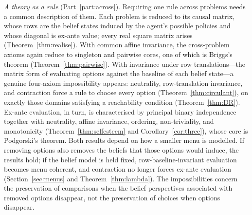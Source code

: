 \emph{A theory as a rule} (Part~\ref{part:across}). Requiring one rule across problems needs a common
description of them. Each problem is reduced to its causal matrix, whose rows are the belief states
induced by the agent's possible policies and whose diagonal is ex-ante value; every real square matrix
arises (Theorem~\ref{thm:realise}). With common affine invariance, the cross-problem axioms again
reduce to singleton and pairwise cores, one of which is Briggs's theorem (Theorem~\ref{thm:pairwise}).
With invariance under row translations---the matrix form of evaluating options against the baseline
of each belief state---a genuine four-axiom impossibility appears: neutrality, row-translation
invariance, and contraction force a rule to choose every option (Theorem~\ref{thm:circulant}), on
exactly those domains satisfying a reachability condition (Theorem~\ref{thm:DR}). Ex-ante evaluation,
in turn, is characterised by principal binary independence together with neutrality, affine
invariance, ordering, non-triviality, and monotonicity (Theorem~\ref{thm:selfesteem} and
Corollary~\ref{cor:three}), whose core is Podgorski's theorem. Both results depend on how a smaller
menu is modelled. If removing options also removes the beliefs that those options would induce, the
results hold; if the belief model is held fixed, row-baseline-invariant evaluation becomes menu
coherent, and contraction no longer forces ex-ante evaluation (Section~\ref{sec:menus} and
Theorem~\ref{thm:lambda}). The impossibilities concern the preservation of comparisons when the belief
perspectives associated with removed options disappear, not the preservation of choices when options
disappear.

